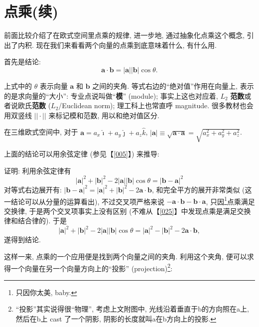 
\section{点乘(续)}\label{026}

前面比较介绍了在欧式空间里点乘的规律, 进一步地, 通过抽象化点乘这个概念,
引出了内积. 现在我们来看看两个向量的点乘到底意味着什么, 有什么用.

首先是结论: \[
\boxed{\boldsymbol{a}\cdot\boldsymbol{b}=|\boldsymbol{a}||\boldsymbol{b}|\cos\theta}.
\]

\begin{newquote}
上式中的 \(\theta\) 表示向量 \(\boldsymbol{a}\) 和 \(\boldsymbol{b}\)
之间的夹角. 等式右边的``绝对值''作用在向量上, 表示的是求向量的``大小'':
专业点说叫做``\textbf{模}'' (module); 事实上这也对应着, \(L_2\)
\textbf{范数}或者说欧氏\textbf{范数} (\(L_2\)/Euclidean norm);
理工科上也常直呼 magnitude. 很多教材也会用双竖线 \(||\cdot||\)
来标记模和范数, 用以和绝对值区分.

在三维欧式空间中, 对于
\(\boldsymbol{a}=a_x\hat{\imath}+a_y\hat{\jmath}+a_z\hat{k}\),
\(|\boldsymbol{a}|\equiv\sqrt{\boldsymbol{a}\cdot\boldsymbol{a}}=\sqrt{a_x^2+a_y^2+a_z^2}\).
\end{newquote}

上面的结论可以用余弦定律 (参见【\ref{005}】) 来推导:

\begin{tcolorbox}[size=fbox, breakable, enhanced jigsaw]
\end{tcolorbox}

\begin{newquote}
证明: 利用余弦定律有 \[
|\boldsymbol{a}|^2+|\boldsymbol{b}|^2-2|\boldsymbol{a}||\boldsymbol{b}|\cos\theta=|\boldsymbol{b}-\boldsymbol{a}|^2
\] 对等式右边展开有:
\(|\boldsymbol{b}-\boldsymbol{a}|^2=|\boldsymbol{a}|^2+|\boldsymbol{b}|^2-2\boldsymbol{a}\cdot\boldsymbol{b}\),
和完全平方的展开非常类似 (这一结论可以从分量的运算看出),
不过交叉项严格来说
\(-\boldsymbol{a}\cdot\boldsymbol{b}-\boldsymbol{b}\cdot\boldsymbol{a}\),
只因\footnote{只因你太美, baby.}点乘满足交换律,
于是两个交叉项事实上没有区别
(不难从【\ref{025}】中发现点乘是满足交换律和结合律的). 于是 \[
|\boldsymbol{a}|^2+|\boldsymbol{b}|^2-2|\boldsymbol{a}||\boldsymbol{b}|\cos\theta=|\boldsymbol{a}|^2-|\boldsymbol{b}|^2-2\boldsymbol{a}\cdot\boldsymbol{b},
\] 遂得到结论.
\end{newquote}

这样一来, 点乘的一个应用便是找到两个向量之间的夹角. 利用这个夹角,
便可以求得一个向量在另一个向量方向上的``投影'' (projection)\footnote{``投影''其实说得很``物理'',
  考虑上文附图中, 光线沿着垂直于b的方向照在a上, 然后在b上 cast
  了一个阴影, 阴影的长度就叫a在b方向上的投影.}:

